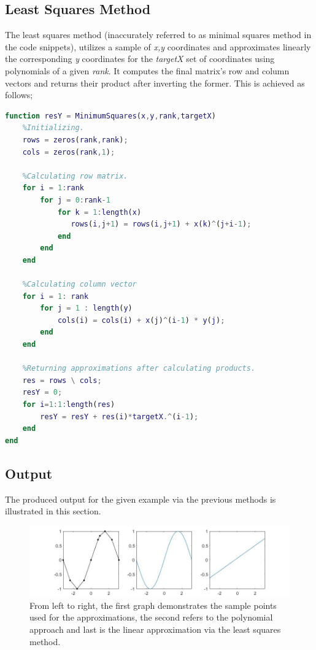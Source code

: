 \documentclass{article}
\begin{document}
\subsection{Least Squares Method}
The least squares method (inaccurately referred to as minimal squares method in the code snippets), utilizes a sample of \emph{x,y} coordinates and approximates linearly the corresponding \emph{y} coordinates for the \emph{targetX} set of coordinates using polynomials of a given \emph{rank}. It computes the final matrix's row and column vectors and returns their product after inverting the former. This is achieved as follows;

\begin{lstlisting}[language=Matlab]
function resY = MinimumSquares(x,y,rank,targetX)
    %Initializing.
    rows = zeros(rank,rank);
    cols = zeros(rank,1);

    %Calculating row matrix.
    for i = 1:rank
        for j = 0:rank-1
            for k = 1:length(x)
               rows(i,j+1) = rows(i,j+1) + x(k)^(j+i-1);
            end
        end
    end

    %Calculating column vector
    for i = 1: rank
        for j = 1 : length(y)
            cols(i) = cols(i) + x(j)^(i-1) * y(j);
        end
    end

    %Returning approximations after calculating products.
    res = rows \ cols;
    resY = 0;
    for i=1:1:length(res)
        resY = resY + res(i)*targetX.^(i-1);
    end
end
\end{lstlisting}
\pagebreak
\subsection{Output}
The produced output for the given example via the previous methods is illustrated in this section.
\linebreak 
\begin{figure}[h]
\centering
\includegraphics[scale=0.5]{images/sin_approx_figs.jpg}
\caption{From left to right, the first graph demonstrates the sample points used for the approximations, the second refers to the polynomial approach and last is the linear approximation via the least squares method.}
\end{figure}
\end{document}
